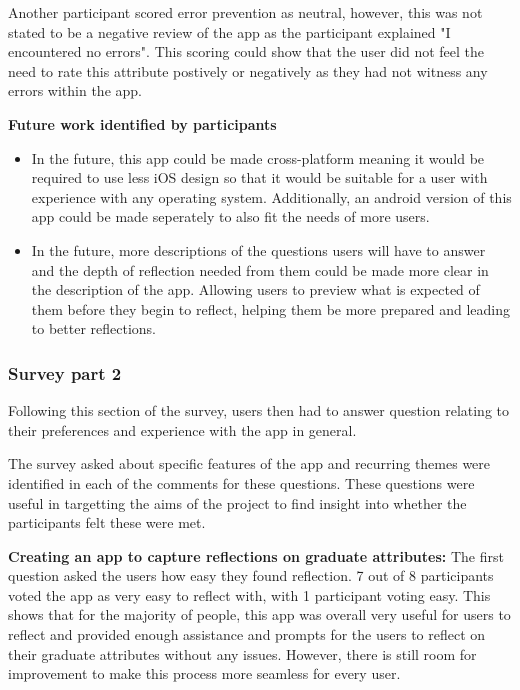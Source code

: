 \documentclass{l4proj}
\begin{document}
Another participant scored error prevention as neutral, however, this was not stated to be a negative review of the app as the participant explained "I encountered no errors". This scoring could show that the user did not feel the need to rate this attribute postively or negatively as they had not witness any errors within the app. 
 
\textbf{Future work identified by participants}
\begin{itemize}
    \item In the future, this app could be made cross-platform meaning it would be required to use less iOS design so that it would be suitable for a user with experience with any operating system. Additionally, an android version of this app could be made seperately to also fit the needs of more users. 
    \item In the future, more descriptions of the questions users will have to answer and the depth of reflection needed from them could be made more clear in the description of the app. Allowing users to preview what is expected of them before they begin to reflect, helping them be more prepared and leading to better reflections.
\end{itemize}

\subsubsection{Survey part 2}
 
Following this section of the survey, users then had to answer question relating to their preferences and experience with the app in general. 

The survey asked about specific features of the app and recurring themes were identified in each of the comments for these questions. These questions were useful in targetting the aims of the project to find insight into whether the participants felt these were met.
 
\textbf{Creating an app to capture reflections on graduate attributes:} The first question asked the users how easy they found reflection. 7 out of 8 participants voted the app as very easy to reflect with, with 1 participant voting easy. This shows that for the majority of people, this app was overall very useful for users to reflect and provided enough assistance and prompts for the users to reflect on their graduate attributes without any issues. However, there is still room for improvement to make this process more seamless for every user.
\end{document}
